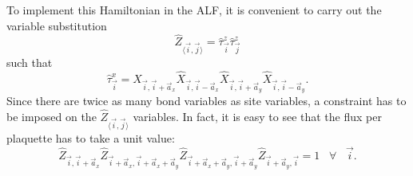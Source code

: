  To implement  this Hamiltonian in the ALF,  it is convenient to  carry out the variable substitution  
 \begin{equation}
 	\hat{Z}_{\langle \vec{i},\vec{j}\rangle} = \hat{\tau}^{z}_{\vec{i}}  \hat{\tau}^{z}_{\vec{j}} 
 \end{equation}
 such that 
 \begin{equation}
 	\hat{\tau}^{x}_{\vec{i}}  = \hat{X}_{\vec{i},\vec{i} +  \vec{a}_x} \hat{X}_{\vec{i},\vec{i} -  \vec{a}_x} \hat{X}_{\vec{i},\vec{i} +  \vec{a}_y} \hat{X}_{\vec{i},\vec{i} -  \vec{a}_y}.
 \end{equation}
 Since there are twice as many bond variables as site variables, a constraint has to be  imposed on the $\hat{Z}_{\langle \vec{i},\vec{j}\rangle} $ variables. In fact, it is easy to see that the flux per plaquette has to take a unit value: 
 \begin{equation}
 \label{Z_constraint.Eq}
 \hat{Z}_{\vec{i},\vec{i} + \vec{a}_x} \hat{Z}_{\vec{i} +\vec{a}_x,\vec{i} + \vec{a}_x +  \vec{a}_y} 
\hat{Z}_{\vec{i} + \vec{a}_x +  \vec{a}_y ,\vec{i} + \vec{a}_y} \hat{Z}_{ \vec{i} + \vec{a}_y, \vec{i}}   = 1 \; \; \;  \forall  \; \; \;  \vec{i}.
 \end{equation}
 
